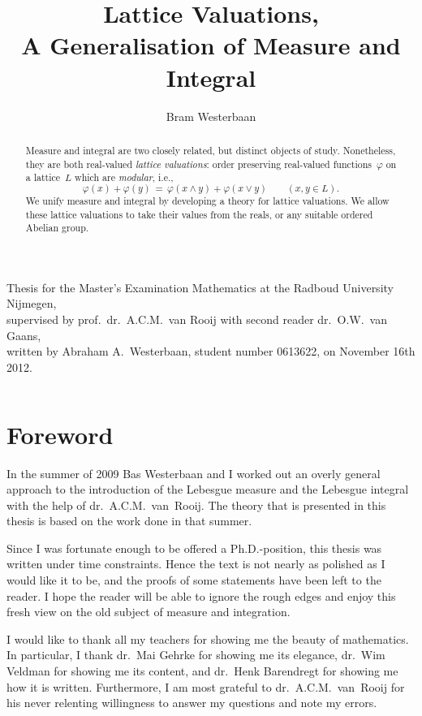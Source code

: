 \documentclass[main.tex]{subfiles}
\begin{document}
\title[A Generalisation of Measure and Integral]{Lattice Valuations,\\
A Generalisation of Measure and Integral}

\author[A.A.~Westerbaan]{Bram Westerbaan}
\maketitle


\vspace{1cm}


\vfill
\noindent
{\tiny
Thesis for the Master's Examination
Mathematics at the Radboud University Nijmegen,\\
supervised by prof.~dr.~A.C.M.~van Rooij
with second reader dr.~O.W.~van Gaans,\\
written by Abraham A.~Westerbaan, 
student number 0613622,
on November 16th 2012.

}
\thispagestyle{empty}
\clearpage
$\,$
\newpage
\begin{abstract}
Measure and integral are two closely related,
but distinct objects of study.
Nonetheless,
they are both real-valued \emph{lattice valuations}:
order preserving real-valued functions~$\varphi$
on a lattice~$L$
which are \emph{modular}, i.e.,
\begin{equation*}
\varphi(x) + \varphi(y) 
\,=\, 
\varphi(x\wedge y) + \varphi(x\vee y)\qquad(x,y\in L).
\end{equation*}
We unify measure and integral
by developing a theory for lattice valuations.
We allow these lattice valuations
to take their values from the reals,
or any suitable ordered Abelian group.
\end{abstract}

\clearpage
%
%
\section*{Foreword}
\noindent
In the summer of 2009  Bas Westerbaan
and I worked out an 
overly general approach
to the introduction of the Lebesgue measure and the Lebesgue integral
with the help of dr.~A.C.M.~van~Rooij.
The theory that is presented in this thesis
is based on the work done in that summer.

Since I was fortunate enough to be offered
a Ph.D.-position,
this thesis was written under time constraints.
Hence the text is not nearly as polished as 
I would like it to be,
and the proofs of some statements
have been left to the reader.
I hope the reader will be able to ignore the rough edges
and enjoy this fresh view on the old subject
of measure and integration.

I would like to thank  all my teachers
for showing me the beauty of mathematics.
In particular, I  thank
dr.~Mai Gehrke for showing me its elegance,
dr.~Wim Veldman for showing me its content, and
dr.~Henk Barendregt for showing me how it is written.
Furthermore, I am most grateful
to dr.~A.C.M.~van~Rooij
for his never relenting willingness 
to answer my questions
and note my errors.
\clearpage
\tableofcontents
\clearpage
\end{document}
